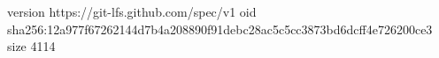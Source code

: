 version https://git-lfs.github.com/spec/v1
oid sha256:12a977f67262144d7b4a208890f91debc28ac5c5cc3873bd6dcff4e726200ce3
size 4114
